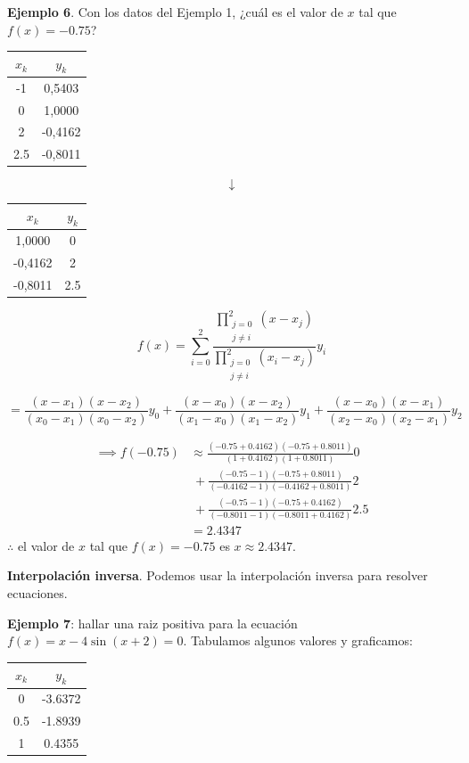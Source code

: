 \documentclass[openany]{book}
\begin{document}
\textbf{Ejemplo 6}. Con los datos del Ejemplo 1, ¿cuál es el valor de \(x\) tal que \(f(x)=-0.75\)?

\begin{longtable}[]{@{}cc@{}}
\toprule
\(x_k\) & \(y_k\)\tabularnewline
\midrule
\endhead
-1 & 0,5403\tabularnewline
0 & 1,0000\tabularnewline
2 & -0,4162\tabularnewline
2.5 & -0,8011\tabularnewline
\bottomrule
\end{longtable}

\[\downarrow\]

\begin{longtable}[]{@{}cc@{}}
\toprule
\(x_k\) & \(y_k\)\tabularnewline
\midrule
\endhead
1,0000 & 0\tabularnewline
-0,4162 & 2\tabularnewline
-0,8011 & 2.5\tabularnewline
\bottomrule
\end{longtable}

\[
f(x) = \sum_{i = 0}^2 \frac{\prod\limits_{\substack{j = 0\\ j \neq i}}^2 (x - x_j)}{\prod\limits_{\substack{j = 0\\ j \neq i}}^2 (x_i - x_j)} y_i
\]

\[
= \frac{(x - x_1)(x - x_2)}{(x_0 - x_1)(x_0 - x_2)} y_0 + \frac{(x - x_0)(x - x_2)}{(x_1 - x_0)(x_1 - x_2)} y_1 + \frac{(x - x_0)(x - x_1)}{(x_2 - x_0)(x_2 - x_1)} y_2
\]

\[
\begin{split}
\implies f(-0.75) &\approx \frac{(-0.75+0.4162)(-0.75+0.8011)}{(1+0.4162)(1+0.8011)} 0 \\
&~ + \frac{(-0.75-1)(-0.75+0.8011)}{(-0.4162-1)(-0.4162+0.8011)} 2 \\
&~ + \frac{(-0.75-1)(-0.75+0.4162)}{(-0.8011-1)(-0.8011+0.4162)} 2.5  \\
&= 2.4347
\end{split}
\]
\(\therefore\) el valor de \(x\) tal que \(f(x)=-0.75\) es \(x \approx 2.4347\).

\textbf{Interpolación inversa}. Podemos usar la interpolación inversa para resolver ecuaciones.

\textbf{Ejemplo 7}: hallar una raiz positiva para la ecuación \(f(x)=x-4\sin(x+2) = 0\). Tabulamos algunos valores y graficamos:

\begin{longtable}[]{@{}cc@{}}
\toprule
\(x_k\) & \(y_k\)\tabularnewline
\midrule
\endhead
0 & -3.6372\tabularnewline
0.5 & -1.8939\tabularnewline
1 & 0.4355\tabularnewline
\bottomrule
\end{longtable}
\end{document}
